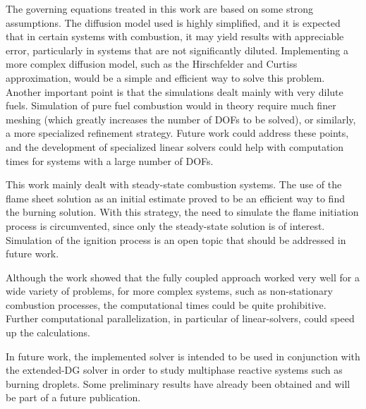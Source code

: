 The governing equations treated in this work are based on some strong assumptions.
The diffusion model used is highly simplified, and it is expected that in certain systems with combustion, it may yield results with appreciable error, particularly in systems that are not significantly diluted. Implementing a more complex diffusion model, such as the Hirschfelder and Curtiss approximation, would be a simple and efficient way to solve this problem. 
Another important point is that the simulations dealt mainly with very dilute fuels. Simulation of pure fuel combustion would in theory require much finer meshing (which greatly increases the number of DOFs to be solved), or similarly, a more specialized refinement strategy. Future work could address these points, and the development of specialized linear solvers could help with computation times for systems with a large number of DOFs.

This work mainly dealt with steady-state combustion systems. The use of the flame sheet solution as an initial estimate proved to be an efficient way to find the burning solution. With this strategy, the need to simulate the flame initiation process is circumvented, since only the steady-state solution is of interest.  Simulation of the ignition process is an open topic that should be addressed in future work. 

Although the work showed that the fully coupled approach worked very well for a wide variety of problems, for more complex systems, such as non-stationary combustion processes, the computational times could be quite prohibitive. Further computational parallelization, in particular of linear-solvers, could speed up the calculations. 



In future work, the implemented solver is intended to be used in conjunction with the extended-DG solver \parencite{kummerExtendedDiscontinuousGalerkin2017,kummerBoSSSPackageMultigrid2021,krauseIncompressibleImmersedBoundary2017}in order to study multiphase reactive systems such as burning droplets. Some preliminary results have already been obtained and will be part of a future publication.

